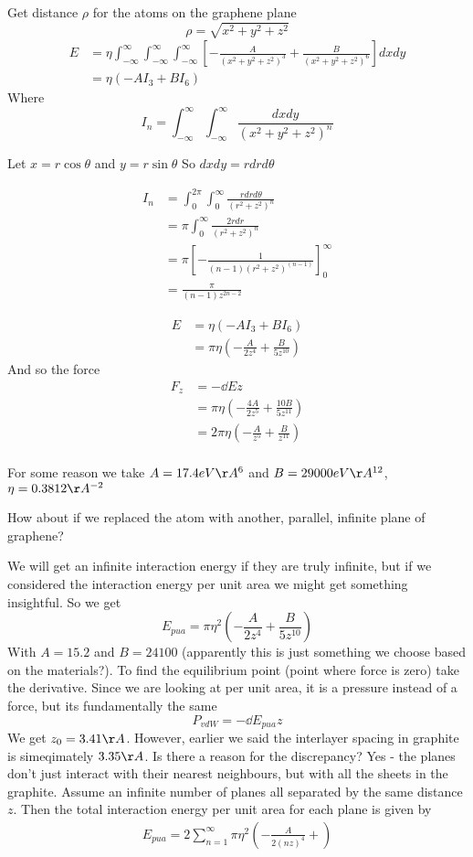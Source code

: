 \documentclass{E:/Documents/Latex/myassignment}
\begin{document}
Get distance $\rho$ for the atoms on the graphene plane
\[\rho = \sqrt{x^2 + y^2 + z^2}\]
\begin{align*}
	E &= \eta \int_{-\infty}^{\infty} \int_{-\infty}^{\infty} \int_{-\infty}^{\infty} \left[-\frac{A}{(x^2 + y^2 + z^2)^3} + \frac{B}{(x^2 + y^2 + z^2)^6}\right] dxdy\\
	&= \eta(-AI_3 + BI_6)
\end{align*}
Where 
\[I_n = \int_{-\infty}^{\infty} \int_{-\infty}^{\infty} \frac{dxdy}{(x^2+y^2+z^2)^n}\]

Let $x = r\cos\theta$ and $y = r\sin\theta$
So $dxdy = rdrd\theta$

\begin{align*}
	I_n &= \int_0^{2\pi} \int_0^{\infty} \frac{rdrd\theta}{(r^2+z^2)^n}\\
	&=	\pi \int_0^\infty \frac{2rdr}{(r^2 + z^2)^n}\\
	&= \pi \left[-\frac{1}{(n-1) (r^2+z^2)^{(n-1)}}\right]_0^\infty\\
	&= \frac{\pi}{(n-1)z^{2n-2}}
\end{align*}

\begin{align*}
	E &= \eta(-A I_3 + BI_6)\\
	&= \pi \eta \left(- \frac{A}{2z^4} + \frac{B}{5z^{10}}\right)
\end{align*}
And so the force 
\begin{align*}
	F_z &= - \dd Ez\\
	&= \pi\eta\left(-\frac{4A}{2z^5} + \frac{10B}{5z^{11}}\right)\\
	&= 2\pi\eta\left(-\frac{A}{z^5} + \frac{B}{z^{11}}\right)\\
\end{align*}

For some reason we take
$A = 17.4 eV\AA^6 $ and $B =29000 eV\AA^{12} $, $\eta = 0.3812 \AA^{-2}$

How about if we replaced the atom with another, parallel, infinite plane of graphene?


We will get an infinite interaction energy if they are truly infinite, but if we considered the interaction energy per unit area we might get something insightful.
So we get
\[E_{pua} = \pi \eta^2 \left(-\frac{A}{2z^4} + \frac{B}{5z^{10}}\right)\]
With $A=15.2$ and $B= 24100$ (apparently this is just something we choose based on the materials?).
To find the equilibrium point (point where force is zero) take the derivative.
Since we are looking at per unit area, it is a pressure instead of a force, but its fundamentally the same
\[P_{vdW} = - \dd{E_{pua}}{z}\]
We get $z_0 = 3.41 \AA$.
However, earlier we said the interlayer spacing in graphite is simeqimately $3.35 \AA$. Is there a reason for the discrepancy? Yes - the planes don't just interact with their nearest neighbours, but with all the sheets in the graphite. Assume an infinite number of planes all separated by the same distance $z$. Then the total interaction energy per unit area for each plane is given by
\begin{align*}
	E_{pua} = 2 \sum_{n=1}^\infty \pi \eta^2 \left(- \frac{A}{2(nz)^4} +\right)
\end{align*}
\end{document}
